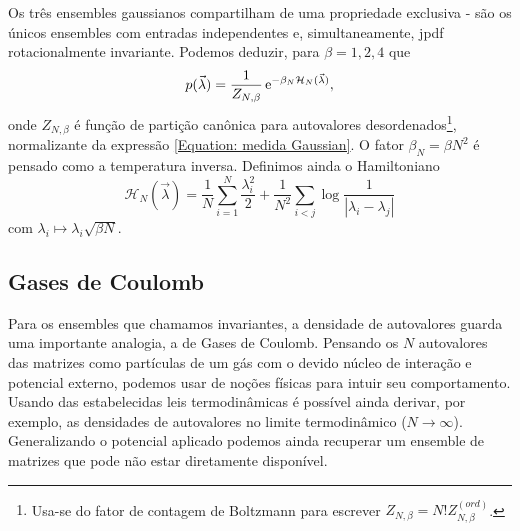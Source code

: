 \documentclass[12pt]{report}
\begin{document}
Os três ensembles gaussianos compartilham de uma propriedade exclusiva - são os únicos ensembles com entradas independentes e, simultaneamente, jpdf rotacionalmente invariante. Podemos deduzir, para $\beta = 1,2,4$ que
\begin{equation}
	p(\vec{\lambda}) = \frac{1}{Z_{N, \beta}} \operatorname{\rm e}^{-\beta_N \mathcal{H}_N(\vec{\lambda})},
	\label{Equation: medida Gaussian}
\end{equation}
onde $Z_{N, \beta}$ é função de partição canônica para autovalores desordenados\footnote{Usa-se do fator de contagem de Boltzmann para escrever $ Z_{N, \beta} = N! Z_{N, \beta}^{(ord)}$.}, normalizante da expressão \ref{Equation: medida Gaussian}. O fator $\beta_N = \beta N^2$ é pensado como a temperatura inversa. Definimos ainda o Hamiltoniano $$\mathcal{H}_N(\vec{\lambda}) = \frac{1}{N}\sum_{i = 1}^{N} \frac{\lambda_i^2}{2} + \frac{1}{N^2} \sum_{i < j} \log{\frac{1}{|\lambda_i - \lambda_j|}}$$ com  $\lambda_i \mapsto \lambda_i \sqrt{\beta N}$.

\subsection{Gases de Coulomb}

Para os ensembles que chamamos invariantes, a densidade de autovalores guarda uma importante analogia, a de Gases de Coulomb. Pensando os $N$ autovalores das matrizes como partículas de um gás com o devido núcleo de interação e potencial externo, podemos usar de noções físicas para intuir seu comportamento. Usando das estabelecidas leis termodinâmicas é possível ainda derivar, por exemplo, as densidades de autovalores no limite termodinâmico ($N \rightarrow \infty$). Generalizando o potencial aplicado podemos ainda recuperar um ensemble de matrizes que pode não estar diretamente disponível.

\end{document}
